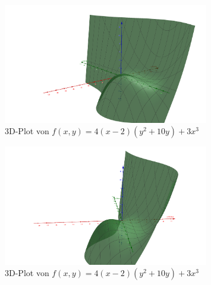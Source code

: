 \begin{figure}[ht]
  \centering
  \includegraphics[width=0.8\textwidth]{../tex-snippets/ex-fn-extrema-6-img-a.png}
  \caption{3D-Plot von $f(x,y) = 4(x-2)(y^2+10y)+3x^3$}
  \label{ex-fn-extrema-6-img-a}
\end{figure}

\begin{figure}[ht]
  \centering
  \includegraphics[width=0.8\textwidth]{../tex-snippets/ex-fn-extrema-6-img-b.png}
  \caption{3D-Plot von $f(x,y) = 4(x-2)(y^2+10y)+3x^3$}
  \label{ex-fn-extrema-6-img-b}
\end{figure}

